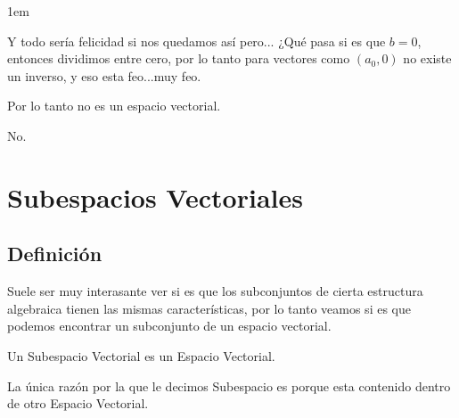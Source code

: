 \documentclass[12pt, fleqn]{report}                             %
\newenvironment{SmallIndentation}[1][0.75em]                    %
        {\begin{adjustwidth}{#1}{}\begin{footnotesize}}             %
        {\end{footnotesize}\end{adjustwidth}}                       %
\theoremstyle{break}                                            %
\begin{document}
\begin{itemize}
\begin{SmallIndentation}[1em]
\begin{itemize}
                                Y todo sería felicidad si nos quedamos así pero...
                                ¿Qué pasa si es que $b = 0$, entonces dividimos entre
                                cero, por lo tanto para vectores como $(a_0, 0)$ no existe
                                un inverso, y eso esta feo...muy feo.

                                Por lo tanto no es un espacio vectorial.

                        \end{itemize}

                        No.

                    \end{SmallIndentation}
                        
            \end{itemize}



    \chapter{Subespacios Vectoriales}

        \clearpage
        \section{Definición}

            Suele ser muy interasante ver si es que los subconjuntos de cierta estructura
            algebraica tienen las mismas características, por lo tanto veamos si es que
            podemos encontrar un subconjunto de un espacio vectorial.

            Un Subespacio Vectorial es un Espacio Vectorial.

            La única razón por la que le decimos Subespacio es porque esta contenido dentro de
            otro Espacio Vectorial.

\end{document}
